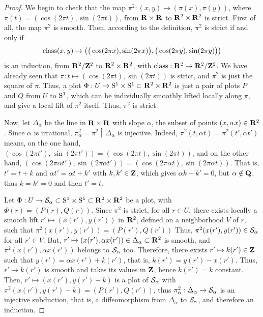 \begin{proof}
  We begin to check that the map $\pi^2 : (x,y) \mapsto (\pi(x), \pi(y))$, where
  $\pi(t) = (\cos(2\pi t),\sin(2\pi t))$, from $\mathbf{R} \times \mathbf{R}$ to $\mathbf{R}^2 \times \mathbf{R}^2$ is strict.
  First of all,
  the map $\pi^2$ is smooth.
  Then,
  according to the definition, $\pi^2$ is strict if and only if
  $$%
    \Class(x,y) \mapsto \left(\big(\cos(2\pi x),\sin(2\pi x)\big),\big(\cos(2\pi y),\sin(2\pi y)\big)\right)
    $$%
  is an induction, from $\mathbf{R}^2/\mathbf{Z}^2$ to $\mathbf{R}^2 \times \mathbf{R}^2$,
  with $\operatorname{class} : \mathbf{R}^2 \to \mathbf{R}^2/\mathbf{Z}^2$.
  We have already seen that $\pi : t \mapsto (\cos(2\pi t),\sin(2\pi t))$ is strict,
  and $\pi^2$ is just the square of $\pi$.
  Thus,
  a plot $\Phi : U \to \mathrm{S}^1 \times \mathrm{S}^1 \subset \mathbf{R}^2 \times \mathbf{R}^2$ is just a pair of plots $P$ and $Q$ from $U$ to $\mathrm{S}^1$,
  which can be individually smoothly lifted locally along $\pi$,
  and give a local lift of $\pi^2$ itself.
  Thus, $\pi^2$ is strict.
  
  Now,
  let $\Delta_\alpha$ be the line in $\mathbf{R} \times \mathbf{R}$ with slope $\alpha$,
  the subset of points $(x,\alpha x) \in \mathbf{R}^2$.
  Since
  $\alpha$ is irrational, $\pi^2_\alpha = \pi^2 \restriction \Delta_\alpha$ is injective.
  Indeed,
  $\pi^2(t,\alpha t) = \pi^2(t',\alpha t')$ means,
  on the one hand,
  $(\cos(2\pi t'),\sin(2\pi t')) = (\cos(2\pi t),\sin(2\pi t))$,
  and on the other hand,
  $(\cos(2\pi \alpha t'),\sin(2\pi \alpha t')) = (\cos(2\pi \alpha t),\sin(2\pi \alpha t))$.
  That is,
  $t' = t + k$ and $\alpha t' = \alpha t + k'$ with $k,k' \in \mathbf{Z}$,
  which gives $\alpha k - k' = 0$,
  but $\alpha \notin \mathbf{Q}$,
  thus $k = k' = 0$ and then $t'=t$.
  
  Let
  $\Phi : U \to \mathcal{S}_\alpha \subset \mathrm{S}^1 \times \mathrm{S}^1 \subset \mathbf{R}^2 \times \mathbf{R}^2$ be a
  plot, with $\Phi(r)=(P(r),Q(r))$. Since $\pi^2$ is strict, for all $r \in U$,
  there exists locally a smooth lift $r' \mapsto (x(r'),y(r'))$ in $\mathbf{R}^2$,
  defined on a neighborhood $V$ of $r$, such that $\pi^2(x(r'),y(r')) = (P(r'),Q(r'))$
  Thus, $\pi^2(x(r'),y(r')) \in \mathcal{S}_\alpha$
  for all $r' \in V$. But,
  $r' \mapsto (x(r'),\alpha x(r')) \in \Delta_\alpha \subset \mathbf{R}^2$ is smooth,
  and $\pi^2(x(r'),\alpha x(r'))$ belongs to $\mathcal{S}_\alpha$ too.
  Therefore, there exists $r' \mapsto k(r') \in \mathbf{Z}$ such that
  $y(r') = \alpha x(r') + k(r')$, that is,
  $k(r') = y(r') - x(r')$.
  Thus, $r' \mapsto k(r')$ is smooth and takes its values in $\mathbf{Z}$, hence
  $k(r') = k$ constant. Then,
  $r' \mapsto (x(r'), y(r') - k)$ is a plot of $\mathcal{S}_\alpha$
  with $\pi^2(x(r'), y(r') - k) = (P(r'),Q(r'))$, thus
  $\pi^2_\alpha : \Delta_\alpha \to \mathcal{S}_\alpha$ is an injective subduction,
  that is, a diffeomorphism from $\Delta_\alpha$
  to $\mathcal{S}_\alpha$, and therefore an induction.
\end{proof}

